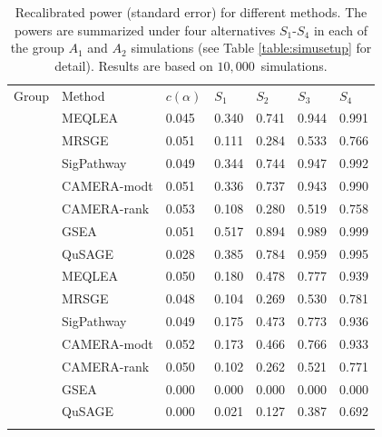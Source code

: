 \documentclass[a4,center,fleqn]{NAR}
\newcommand{\OurMethod}{MEQLEA}
\newcommand{\CMR}{CAMERA-rank}
\newcommand{\CMT}{CAMERA-modt}
\newcommand{\gent}{SigPathway}
\newcommand{\genr}{MRSGE}
\newcommand{\HowmanySimu}{$10,000$}
\begin{document}
	\begin{table}[!ht]
		\centering
		\caption{Recalibrated power (standard error) for different methods. The powers are summarized
			under four alternatives $S_1$-$S_4$ in each of the group $A_1$ and $A_2$ simulations (see Table
			\ref{table:simusetup} for detail). Results are based on \HowmanySimu~simulations.
		}\label{table:power}
		\begin{tabular}{cp{3cm}p{2cm}p{2cm}p{2cm}p{2cm}p{2cm}}
			\toprule
			Group & Method &$c(\alpha)$	& $S_1$ & $S_2$ & $S_3$	&$S_4$  \\ 
			\colrule
			\multirow{7}{*}{$A_1$} & \OurMethod & 0.045 & 0.340 & 0.741 & 0.944 & 0.991 \\ 
			&	\genr  & 0.051 & 0.111 & 0.284 & 0.533 & 0.766 \\ 
			&	\gent & 0.049 & 0.344 & 0.744 & 0.947 & 0.992 \\ 
			&	\CMT  & 0.051 & 0.336 & 0.737 & 0.943 & 0.990 \\ 
			&	\CMR  & 0.053 & 0.108 & 0.280 & 0.519 & 0.758 \\ 
			&	GSEA & 0.051 & 0.517 & 0.894 & 0.989 & 0.999 \\ 
			&	QuSAGE & 0.028 & 0.385 & 0.784 & 0.959 & 0.995 \\ 
		\colrule
			\multirow{7}{*}{$A_2$} &	MEQLEA & 0.050 & 0.180 & 0.478 & 0.777 & 0.939 \\ 
			&		\genr & 0.048 & 0.104 & 0.269 & 0.530 & 0.781 \\ 
			&		\gent & 0.049 & 0.175 & 0.473 & 0.773 & 0.936 \\  
			&		\CMT & 0.052 & 0.173 & 0.466 & 0.766 & 0.933 \\ 
			&		\CMR & 0.050 & 0.102 & 0.262 & 0.521 & 0.771 \\ 
			&		GSEA & 0.000 & 0.000 & 0.000 & 0.000 & 0.000 \\ 
			&		QuSAGE  & 0.000 & 0.021 & 0.127 & 0.387 & 0.692 \\ 
		\botrule
		\end{tabular}
	\end{table}
	
	
	
\end{document}
